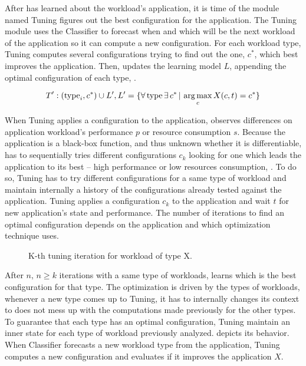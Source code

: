 After \name has learned about the workload's application, it is time of the module named Tuning figures out the best
configuration for the application. The Tuning module uses the Classifier to forecast when and which will be the next
workload of the application so it can compute a new configuration. For each workload type, Tuning computes several
configurations trying to find out the one, $c^{*}$, which best improves the application. Then, \name updates the
learning model $L$, appending the optimal configuration of each type, .

\begin{equation}
  T': (\text{type}_i, c^{*} )\cup L', L' = \{ \forall\, \text{type}\, \exists\, c^{*}\, |\, \operatorname*{arg\,max}_c X(c,t) = c^{*}\}
  \label{eq:training-updated}
\end{equation}

When Tuning applies a configuration to the application, \name observes differences on application workload's
performance $p$ or resource consumption $s$. Because the application is a black-box function, and thus unknown whether
it is differentiable, \name has to sequentially tries different configurations $c_k$ looking for one which leads the
application to its best -- high performance or low resources consumption, . To do so, Tuning
has to try different configurations for a same type of workload and maintain internally a history of the configurations
already tested against the application.  Tuning applies a configuration $c_k$ to the application and wait $t$ for new
application's state and performance. The number of iterations to find an optimal configuration depends on the
application and which optimization technique \name uses.

\begin{figure*}[htp]
    \centering
    \def\svgwidth{\textwidth}
    \scalebox{1.0}{}
    \caption{K-th tuning iteration for workload of type X.}
    \label{fig:tuning-overview}
\end{figure*}

After $n,\, n \geq k$ iterations with a same type of workloads, \name learns which is the best configuration for that
type. The optimization is driven by the types of workloads, whenever a new type comes up to Tuning, it has to
internally changes its context to does not mess up with the computations made previously for the other types.  To
guarantee that each type has an optimal configuration, Tuning maintain an inner state for each type of workload
previously analyzed.  depicts its behavior. When Classifier forecasts a new workload type from
the application, Tuning computes a new configuration and evaluates if it improves the application $X$.

